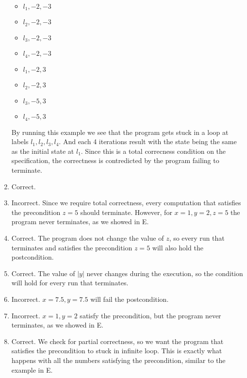 \documentclass{article}
\begin{document}
\begin{enumerate}[label=\Alph*.]
\begin{itemize}
        \item $l_1, -2, -3$
        \item $l_2, -2, -3$
        \item $l_3, -2, -3$
        \item $l_4, -2, -3$
        \item $l_1, -2, 3$
        \item $l_2, -2, 3$
        \item $l_3, -5, 3$
        \item $l_4, -5, 3$
    \end{itemize}
    By running this example we see that the program gets stuck in a loop
    at labels $l_1, l_2, l_3, l_4$. And each 4 iterations result with the state
    being the same as the initial state at $l_1$.
    Since this is a total correcness condition on the specification,
    the correctness is contredicted by the program failing to terminate.
    \item Correct.
    \item Incorrect. Since we require total correctness, every computation that satisfies the precondition $z=5$ should terminate. However, for $x=1, y=2, z=5$ the program never terminates, as we showed in E.
    \item Correct. The program does not change the value of $z$, so every run that terminates and satisfies the precondition $z=5$ will also hold the postcondition.
    \item Correct. The value of $|y|$ never changes during the execution, so the condition will hold for every run that terminates.
    \item Incorrect. $x=7.5, y=7.5$ will fail the postcondition.
    \item Incorrect. $x=1, y=2$ satisfy the precondition, but the program never terminates, as we showed in E.
    \item Correct. We check for partial correctness, so we want the program that satisfies the precondition to stuck in infinite loop. This is exactly what happens with all the numbers satisfying the precondition, similar to the example in E.
\end{enumerate}
\end{document}
